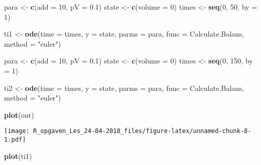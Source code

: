 \documentclass[]{article}
\newenvironment{Shaded}{\begin{snugshade}}{\end{snugshade}}
\newcommand{\KeywordTok}[1]{\textcolor[rgb]{0.13,0.29,0.53}{\textbf{#1}}}
\newcommand{\DataTypeTok}[1]{\textcolor[rgb]{0.13,0.29,0.53}{#1}}
\newcommand{\DecValTok}[1]{\textcolor[rgb]{0.00,0.00,0.81}{#1}}
\newcommand{\FloatTok}[1]{\textcolor[rgb]{0.00,0.00,0.81}{#1}}
\newcommand{\StringTok}[1]{\textcolor[rgb]{0.31,0.60,0.02}{#1}}
\newcommand{\NormalTok}[1]{#1}
\begin{document}
\begin{Shaded}
\begin{Highlighting}[]
\NormalTok{para <-}\StringTok{ }\KeywordTok{c}\NormalTok{(}\DataTypeTok{add =} \DecValTok{10}\NormalTok{, }\DataTypeTok{pV =} \FloatTok{0.1}\NormalTok{)}
\NormalTok{state <-}\StringTok{ }\KeywordTok{c}\NormalTok{(}\DataTypeTok{volume =} \DecValTok{0}\NormalTok{)}
\NormalTok{times <-}\StringTok{ }\KeywordTok{seq}\NormalTok{(}\DecValTok{0}\NormalTok{, }\DecValTok{50}\NormalTok{,  }\DataTypeTok{by =} \DecValTok{1}\NormalTok{)}

\NormalTok{ti1 <-}\StringTok{ }\KeywordTok{ode}\NormalTok{(}\DataTypeTok{time =}\NormalTok{ times,}
           \DataTypeTok{y =}\NormalTok{ state,}
           \DataTypeTok{parms =}\NormalTok{ para,}
           \DataTypeTok{func =}\NormalTok{ Calculate.Balans,}
           \DataTypeTok{method =} \StringTok{"euler"}\NormalTok{)}

\NormalTok{para <-}\StringTok{ }\KeywordTok{c}\NormalTok{(}\DataTypeTok{add =} \DecValTok{10}\NormalTok{, }\DataTypeTok{pV =} \FloatTok{0.1}\NormalTok{)}
\NormalTok{state <-}\StringTok{ }\KeywordTok{c}\NormalTok{(}\DataTypeTok{volume =} \DecValTok{0}\NormalTok{)}
\NormalTok{times <-}\StringTok{ }\KeywordTok{seq}\NormalTok{(}\DecValTok{0}\NormalTok{, }\DecValTok{150}\NormalTok{,  }\DataTypeTok{by =} \DecValTok{1}\NormalTok{)}

\NormalTok{ti2 <-}\StringTok{ }\KeywordTok{ode}\NormalTok{(}\DataTypeTok{time =}\NormalTok{ times,}
           \DataTypeTok{y =}\NormalTok{ state,}
           \DataTypeTok{parms =}\NormalTok{ para,}
           \DataTypeTok{func =}\NormalTok{ Calculate.Balans,}
           \DataTypeTok{method =} \StringTok{"euler"}\NormalTok{)}
\end{Highlighting}
\end{Shaded}

\begin{Shaded}
\begin{Highlighting}[]
\KeywordTok{plot}\NormalTok{(out)}
\end{Highlighting}
\end{Shaded}

\texttt{[image: R\_opgaven\_Les\_24-04-2018\_files/figure-latex/unnamed-chunk-8-1.pdf]}

\begin{Shaded}
\begin{Highlighting}[]
\KeywordTok{plot}\NormalTok{(ti1)}
\end{Highlighting}
\end{Shaded}
\end{document}
